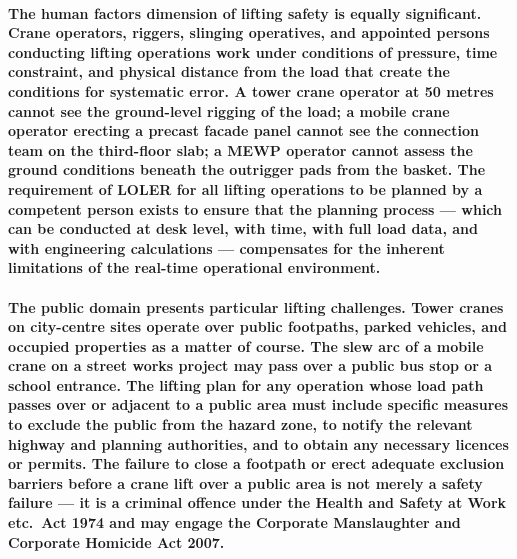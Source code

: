\paragraph{The human factors dimension of lifting safety is equally significant. Crane operators, riggers, slinging operatives, and appointed persons conducting lifting operations work under conditions of pressure, time constraint, and physical distance from the load that create the conditions for systematic error. A tower crane operator at 50 metres cannot see the ground-level rigging of the load; a mobile crane operator erecting a precast facade panel cannot see the connection team on the third-floor slab; a MEWP operator cannot assess the ground conditions beneath the outrigger pads from the basket. The requirement of LOLER for all lifting operations to be planned by a competent person exists to ensure that the planning process --- which can be conducted at desk level, with time, with full load data, and with engineering calculations --- compensates for the inherent limitations of the real-time operational environment.}

\paragraph{The public domain presents particular lifting challenges. Tower cranes on city-centre sites operate over public footpaths, parked vehicles, and occupied properties as a matter of course. The slew arc of a mobile crane on a street works project may pass over a public bus stop or a school entrance. The lifting plan for any operation whose load path passes over or adjacent to a public area must include specific measures to exclude the public from the hazard zone, to notify the relevant highway and planning authorities, and to obtain any necessary licences or permits. The failure to close a footpath or erect adequate exclusion barriers before a crane lift over a public area is not merely a safety failure --- it is a criminal offence under the Health and Safety at Work etc.\ Act 1974 and may engage the Corporate Manslaughter and Corporate Homicide Act 2007.}


